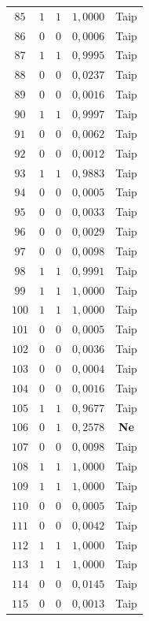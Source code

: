 \begin{longtable}{ccccc}
    $85$ & $1$ & $1$ & $1{,}0000$ & Taip \\
    $86$ & $0$ & $0$ & $0{,}0006$ & Taip \\
    $87$ & $1$ & $1$ & $0{,}9995$ & Taip \\
    $88$ & $0$ & $0$ & $0{,}0237$ & Taip \\
    $89$ & $0$ & $0$ & $0{,}0016$ & Taip \\
    $90$ & $1$ & $1$ & $0{,}9997$ & Taip \\
    $91$ & $0$ & $0$ & $0{,}0062$ & Taip \\
    $92$ & $0$ & $0$ & $0{,}0012$ & Taip \\
    $93$ & $1$ & $1$ & $0{,}9883$ & Taip \\
    $94$ & $0$ & $0$ & $0{,}0005$ & Taip \\
    $95$ & $0$ & $0$ & $0{,}0033$ & Taip \\
    $96$ & $0$ & $0$ & $0{,}0029$ & Taip \\
    $97$ & $0$ & $0$ & $0{,}0098$ & Taip \\
    $98$ & $1$ & $1$ & $0{,}9991$ & Taip \\
    $99$ & $1$ & $1$ & $1{,}0000$ & Taip \\
    $100$ & $1$ & $1$ & $1{,}0000$ & Taip \\
    $101$ & $0$ & $0$ & $0{,}0005$ & Taip \\
    $102$ & $0$ & $0$ & $0{,}0036$ & Taip \\
    $103$ & $0$ & $0$ & $0{,}0004$ & Taip \\
    $104$ & $0$ & $0$ & $0{,}0016$ & Taip \\
    $105$ & $1$ & $1$ & $0{,}9677$ & Taip \\
    \rowcolor{pink} $106$ & $0$ & $1$ & $0{,}2578$ & \textbf{Ne} \\
    $107$ & $0$ & $0$ & $0{,}0098$ & Taip \\
    $108$ & $1$ & $1$ & $1{,}0000$ & Taip \\
    $109$ & $1$ & $1$ & $1{,}0000$ & Taip \\
    $110$ & $0$ & $0$ & $0{,}0005$ & Taip \\
    $111$ & $0$ & $0$ & $0{,}0042$ & Taip \\
    $112$ & $1$ & $1$ & $1{,}0000$ & Taip \\
    $113$ & $1$ & $1$ & $1{,}0000$ & Taip \\
    $114$ & $0$ & $0$ & $0{,}0145$ & Taip \\
    $115$ & $0$ & $0$ & $0{,}0013$ & Taip \\

\end{longtable}
